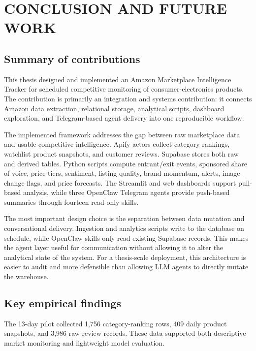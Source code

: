 \chapter{CONCLUSION AND FUTURE WORK}
\label{chap:conclusion}

\section{Summary of contributions}

This thesis designed and implemented an Amazon Marketplace Intelligence Tracker for scheduled competitive monitoring of consumer-electronics products. The contribution is primarily an integration and systems contribution: it connects Amazon data extraction, relational storage, analytical scripts, dashboard exploration, and Telegram-based agent delivery into one reproducible workflow.

The implemented framework addresses the gap between raw marketplace data and usable competitive intelligence. Apify actors collect category rankings, watchlist product snapshots, and customer reviews. Supabase stores both raw and derived tables. Python scripts compute entrant/exit events, sponsored share of voice, price tiers, sentiment, listing quality, brand momentum, alerts, image-change flags, and price forecasts. The Streamlit and web dashboards support pull-based analysis, while three OpenClaw Telegram agents provide push-based summaries through fourteen read-only skills.

The most important design choice is the separation between data mutation and conversational delivery. Ingestion and analytics scripts write to the database on schedule, while OpenClaw skills only read existing Supabase records. This makes the agent layer useful for communication without allowing it to alter the analytical state of the system. For a thesis-scale deployment, this architecture is easier to audit and more defensible than allowing LLM agents to directly mutate the warehouse.

\section{Key empirical findings}

The 13-day pilot collected 1,756 category-ranking rows, 409 daily product snapshots, and 3,986 raw review records. These data supported both descriptive market monitoring and lightweight model evaluation.

